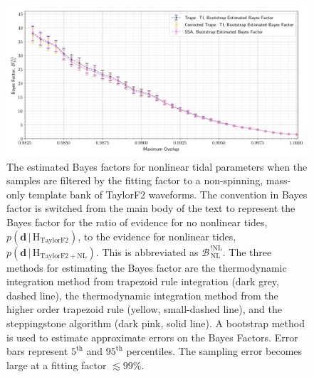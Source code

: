 \begin{figure}
\includegraphics[width=\textwidth]{figs/chapter6/bootstrap_bayes_ff_cuts_average}\caption{The estimated Bayes factors for nonlinear tidal parameters when the samples are filtered by the fitting factor to a non-spinning, mass-only template bank of TaylorF2 waveforms. The convention in Bayes factor is switched from the main body of the text to represent the Bayes factor for the ratio of evidence for no nonlinear tides, $p\left(\mathbf{d}\,|\, \mathrm{H}_\mathrm{TaylorF2}\right)$, to the evidence for nonlinear tides, $p\left(\mathbf{d}\,|\,\mathrm{H}_\mathrm{TaylorF2+NL}\right)$. This is abbreviated as $\mathcal{B}^{\,\mathrm{!NL}}_{\,\mathrm{NL}}$. The three methods for estimating the Bayes factor are the thermodynamic integration method from trapezoid rule integration (dark grey, dashed line), the thermodynamic integration method from the higher order trapezoid rule (yellow, small-dashed line), and the steppingstone algorithm (dark pink, solid line). A bootstrap method is used to estimate approximate errors on the Bayes Factors. Error bars represent $5^{\mathrm{th}}$ and $95^{\mathrm{th}}$ percentiles. The sampling error becomes large at a fitting factor $\lesssim 99$\%.}
\label{fig:bayes_ff_plot}
\end{figure}

